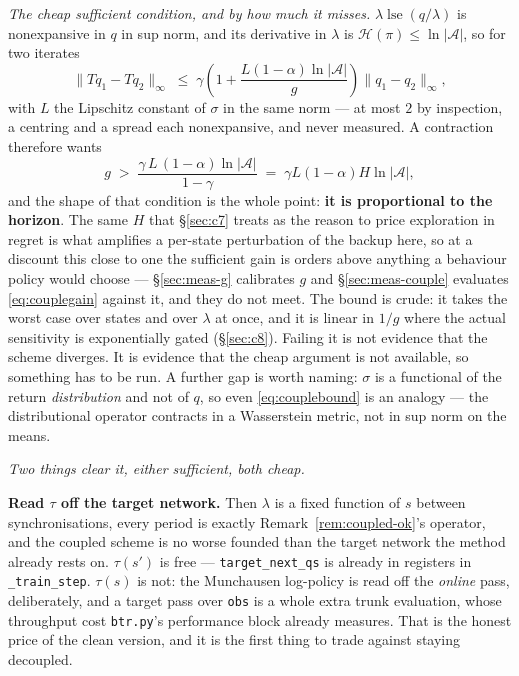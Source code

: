 \documentclass{article}
\newcommand{\actions}{\mathcal{A}}
\newcommand{\h}{\mathcal{H}}
\DeclareMathOperator{\lse}{lse}
\newcommand{\srank}{\sigma}
\begin{document}
\emph{The cheap sufficient condition, and by how much it misses.} $\lambda\lse(q/\lambda)$ is
nonexpansive in $q$ in sup norm, and its derivative in $\lambda$ is $\h(\pi) \le \ln|\actions|$,
so for two iterates
\begin{equation}
  \|Tq_1 - Tq_2\|_\infty \;\le\; \gamma\left(1 + \frac{L(1-\alpha)\ln|\actions|}{g}\right)
  \|q_1 - q_2\|_\infty,
  \label{eq:couplebound}
\end{equation}
with $L$ the Lipschitz constant of $\srank$ in the same norm --- at most $2$ by inspection, a
centring and a spread each nonexpansive, and never measured. A contraction therefore wants
\begin{equation}
  g \;>\; \frac{\gamma\,L\,(1-\alpha)\ln|\actions|}{1-\gamma} \;=\; \gamma L(1-\alpha)H\ln|\actions|,
  \label{eq:couplegain}
\end{equation}
and the shape of that condition is the whole point: \textbf{it is proportional to the horizon}.
The same $H$ that \S\ref{sec:c7} treats as the reason to price exploration in regret is what
amplifies a per-state perturbation of the backup here, so at a discount this close to one the
sufficient gain is orders above anything a behaviour policy would choose --- \S\ref{sec:meas-g}
calibrates $g$ and \S\ref{sec:meas-couple} evaluates \eqref{eq:couplegain} against it, and they
do not meet. The bound is crude: it takes the worst case over states and over $\lambda$ at once,
and it is linear in $1/g$ where the actual sensitivity is exponentially gated (\S\ref{sec:c8}).
Failing it is not evidence that the scheme diverges. It is evidence that the cheap argument is
not available, so something has to be run.
A further gap is worth naming: $\srank$ is a functional of the return \emph{distribution} and
not of $q$, so even \eqref{eq:couplebound} is an analogy --- the distributional operator
contracts in a Wasserstein metric, not in sup norm on the means.

\emph{Two things clear it, either sufficient, both cheap.}

\textbf{Read $\tau$ off the target network.} Then $\lambda$ is a fixed function of $s$ between
synchronisations, every period is exactly Remark~\ref{rem:coupled-ok}'s operator, and the coupled
scheme is no worse founded than the target network the method already rests on. $\tau(s')$ is
free --- \texttt{target\_next\_qs} is already in registers in \texttt{\_train\_step}. $\tau(s)$ is
not: the Munchausen log-policy is read off the \emph{online} pass, deliberately, and a target
pass over \texttt{obs} is a whole extra trunk evaluation, whose throughput cost
\texttt{btr.py}'s performance block already measures. That is the honest price of the clean
version, and it is the first thing to trade against staying decoupled.
\end{document}
